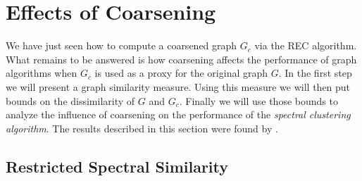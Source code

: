 \section{Effects of Coarsening}%
\label{sec:cons}

We have just seen how to compute a coarsened graph $G_c$ via the REC algorithm.
What remains to be answered is how coarsening affects the performance of graph algorithms when $G_c$ is used as a proxy for the original graph $G$.
In the first step we will present a graph similarity measure.
Using this measure we will then put bounds on the dissimilarity of $G$ and $G_c$.
Finally we will use those bounds to analyze the influence of coarsening on the performance of the \textit{spectral clustering algorithm}.
The results described in this section were found by \citet{Loukas2018}.

\subsection{Restricted Spectral Similarity}%
\label{sec:cons:rss}

